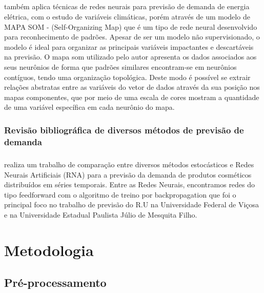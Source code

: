 \documentclass[	12pt, Times, openright, twoside, a4paper, english, brazil]{abntex2}
\begin{document}
        \paragraph*{} \cite{Silva2010} também aplica técnicas de redes neurais para previsão de demanda de energia elétrica, com o estudo de variáveis climáticas, porém através de um modelo de MAPA SOM - (Self-Organizing Map) que é um tipo de rede neural desenvolvido para reconhecimento de padrões. Apesar de ser um modelo não supervisionado, o modelo é ideal para organizar as principais variáveis impactantes e descartáveis na previsão. O mapa som utilizado pelo autor apresenta os dados associados aos seus neurônios de forma que padrões similares encontram-se em neurônios contíguos, tendo uma organização topológica. Deste modo é possível se extrair relações abstratas entre as variáveis do vetor de dados através da sua posição nos mapas componentes, que por meio de uma escala de cores mostram a quantidade de uma variável específica em cada neurônio do mapa.
       
       \subsection{Revisão bibliográfica de diversos métodos de previsão de demanda}
        \paragraph*{} \cite{Junior2007} realiza um trabalho de comparação entre diversos métodos estocásticos e  Redes Neurais Artificiais (RNA) para a previsão da demanda de produtos cosméticos distribuídos em séries temporais. Entre as Redes Neurais, encontramos redes do tipo feedforward com o algoritmo de treino por backpropagation que foi o principal foco no trabalho de previsão do R.U na Universidade Federal de Viçosa e na Universidade Estadual Paulista Júlio de Mesquita Filho.
  \chapter{Metodologia}
	\section{Pré-processamento}
\end{document}

